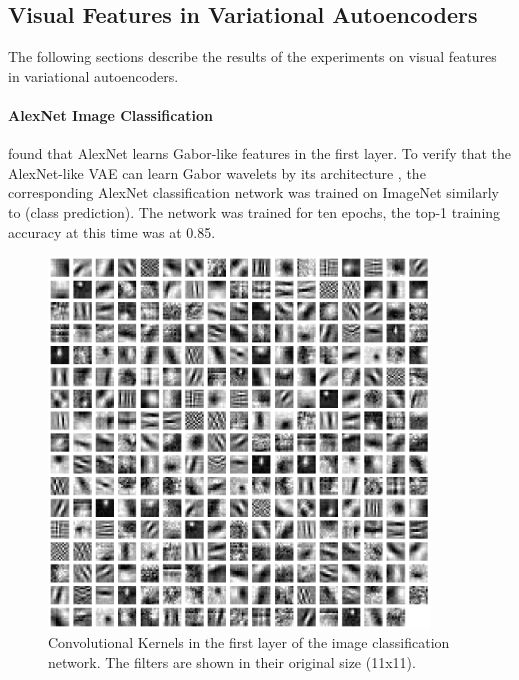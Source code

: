 \subsection{Visual Features in Variational Autoencoders}\label{subsec:results_visual_features_in_variational_autoencoders}
The following sections describe the results of the experiments on visual features in variational autoencoders.

\paragraph{AlexNet Image Classification}
\citet{krizhevsky2012imagenet} found that AlexNet learns Gabor-like features in the first layer.
To verify that the AlexNet-like \ac{VAE} can learn Gabor wavelets by its architecture , the corresponding AlexNet classification network was trained on ImageNet similarly to \citet{krizhevsky2012imagenet} (class prediction).
The network was trained for ten epochs, the top-1 training accuracy at this time was at 0.85.

\begin{figure}
    \centering
    \includegraphics[width=0.9\textwidth]{images/alexnet_classification_l1_kernels.png}
    \caption[Image classification - Layer 1 Kernels]{Convolutional Kernels in the first layer of the image classification network. The filters are shown in their original size (11x11).}
    \label{fig:classification_layer1_kernels}
\end{figure}

